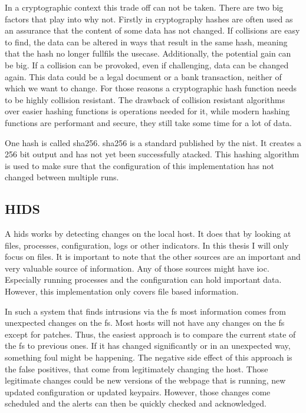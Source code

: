 \documentclass[
	a4paper,					%
	10pt,							%
	twoside,					%
	openright,				%
	notitlepage,			%
	parskip=half,			%
]{scrreprt}					%
\begin{document}
In a cryptographic context this trade off can not be taken. There are two big factors that play into why not. Firstly in cryptography hashes are often used as an assurance that the content of some data has not changed. If collisions are easy to find, the data can be altered in ways that result in the same hash, meaning that the hash no longer fullfils the usecase. Additionally, the potential gain can be big. If a collision can be provoked, even if challenging, data can be changed again. This data could be a legal document or a bank transaction, neither of which we want to change. For those reasons a cryptographic hash function needs to be highly collision resistant. The drawback of collision resistant algorithms over easier hashing functions is operations needed for it, while modern hashing functions are performant and secure, they still take some time for a lot of data. \cite{crypto}

One \gls{hash} is called \gls{sha256}. \gls{sha256} is a standard published by the \gls{nist}. It creates a 256 bit output and has not yet been successfully atacked. \cite{sha} This hashing algorithm is used to make sure that the configuration of this implementation has not changed between multiple runs.


\subsection{HIDS}
\label{sec:def:hids}

A \gls{hids} works by detecting changes on the local host. It does that by looking at files, processes, configuration, logs or other indicators. In this thesis I will only focus on files. It is important to note that the other sources are an important and very valuable source of information. Any of those sources might have \gls{ioc}. Especially running processes and the configuration can hold important data. However, this implementation only covers file based information.

In such a system that finds intrusions via the \gls{fs} most information comes from unexpected changes on the \gls{fs}. Most hosts will not have any changes on the \gls{fs} except for patches. Thus, the easiest approach is to compare the current state of the \gls{fs} to previous ones. If it has changed significantly or in an unexpected way, something foul might be happening. The negative side effect of this approach is the false positives, that come from legitimately changing the host. Those legitimate changes could be new versions of the webpage that is running, new updated configuration or updated keypairs. However, those changes come scheduled and the alerts can then be quickly checked and acknowledged.
\end{document}
